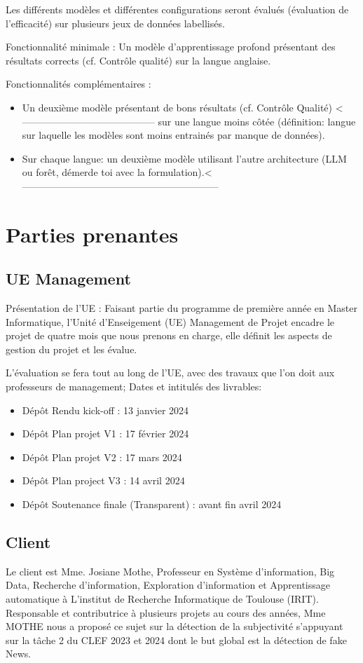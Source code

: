 \documentclass[11pt]{rapport_class}
\begin{document}
Les différents modèles et différentes configurations seront évalués (évaluation de l'efficacité) sur plusieurs jeux de données labellisés.

Fonctionnalité minimale : Un modèle d'apprentissage profond présentant des résultats corrects (cf. Contrôle qualité) sur la langue anglaise.

Fonctionnalités complémentaires :
\begin{itemize}
\item Un deuxième modèle présentant de bons résultats (cf. Contrôle Qualité) <----------------------------------------- sur une langue moins côtée (définition: langue sur laquelle les modèles sont moins entrainés par manque de données). 
\item Sur chaque langue: un deuxième modèle utilisant l'autre architecture (LLM ou forêt, démerde toi avec la formulation).<------------------------------------------------------------
\end{itemize}

\section{Parties prenantes}
\subsection{UE Management}
\qquad Présentation de l'UE : Faisant partie du programme de première année en Master Informatique, l'Unité d'Enseigement (UE) Management de Projet encadre le projet de quatre mois que nous prenons en charge, elle définit les aspects de gestion du projet et les évalue. 

L'évaluation se fera tout au long de l'UE, avec des travaux que l'on doit aux professeurs de management;
Dates et intitulés des livrables:
\begin{itemize}
    \item Dépôt Rendu kick-off  : 13 janvier 2024
    \item Dépôt Plan projet V1  : 17 février 2024
    \item Dépôt Plan projet V2  : 17 mars 2024
    \item Dépôt Plan project V3 : 14 avril 2024
    \item Dépôt Soutenance finale (Transparent) : avant fin avril 2024
\end{itemize}


\subsection{Client}
\qquad Le client est Mme. Josiane Mothe, Professeur en Système d'information, Big Data, Recherche d'information, Exploration d'information et Apprentissage automatique à L'institut de Recherche Informatique de Toulouse (IRIT). Responsable et contributrice à plusieurs projets au cours des années, Mme MOTHE nous a proposé ce sujet sur la détection de la subjectivité s'appuyant sur la tâche 2 du CLEF 2023 et 2024 dont le but global est la détection de fake News.
\end{document}
